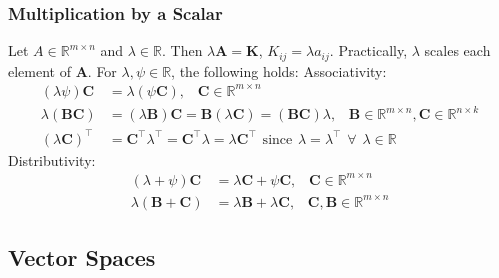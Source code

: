 \documentclass{article}
\begin{document}
 	\subsubsection{Multiplication by a Scalar}
 	Let $A \in \mathbb{R}^{m \times n}$ and $\lambda \in \mathbb{R}$. Then $\lambda\textbf{A} = \textbf{K}$, $K_{ij} = \lambda a_{ij}$. Practically, $\lambda$ scales each element of $\textbf{A}$. For $\lambda, \psi \in \mathbb{R}$, the following holds: \newline\newline
 	Associativity:
 	\begin{align}
 		(\lambda\psi)\textbf{C} &= \lambda(\psi\textbf{C}), \hspace{10pt} \textbf{C} \in \mathbb{R}^{m \times n} \\
 		\lambda(\textbf{BC}) &= (\lambda\textbf{B})\textbf{C} = \textbf{B}(\lambda\textbf{C}) = (\textbf{BC})\lambda, \hspace{10pt} \textbf{B} \in \mathbb{R}^{m \times n}, \textbf{C} \in \mathbb{R}^{n \times k} \\
 		(\lambda\textbf{C})^{\top} &= \textbf{C}^{\top}\lambda^{\top} = \textbf{C}^{\top}\lambda = \lambda\textbf{C}^{\top} \hspace{5pt} \text{since} \hspace{5pt} \lambda = \lambda^{\top} \hspace{5pt} \forall \hspace{5pt} \lambda \in \mathbb{R}
 	\end{align}
 	Distributivity:
 	\begin{align}
 		(\lambda + \psi)\textbf{C} &= \lambda\textbf{C} + \psi\textbf{C}, \hspace{10pt} \textbf{C} \in \mathbb{R}^{m \times n} \\
 		\lambda(\textbf{B} + \textbf{C}) &= \lambda\textbf{B} + \lambda\textbf{C}, \hspace{10pt} \textbf{C}, \textbf{B} \in \mathbb{R}^{m \times n}
 	\end{align}
 	\subsection{Vector Spaces}
\end{document}
